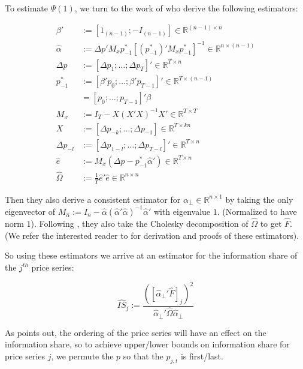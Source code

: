 To estimate $\Psi(1)$, we turn to the work of \cite{KARABIYIK2022} who derive the following estimators:

\begin{align}
\beta' &:= [1_{(n-1)}; -I_{(n-1)}] \in \mathbb{R}^{(n-1) \times n} \\
\hat{\alpha} &:= \Delta p' M_{x} p_{-1}^* [ (p_{-1}^*)' M_{x} p_{-1}^*]^{-1} \in \mathbb{R}^{n \times (n-1)}\\
\Delta p &:= [\Delta p_{1}; \dots ; \Delta p_{T}]' \in \mathbb{R}^{T \times n} \\ 
p_{-1}^* &:= [\beta' p_{0}; \dots ; \beta' p_{T-1}]' \in \mathbb{R}^{T \times (n-1)} \\
&= [p_{0}; \dots ; p_{T-1}]' \beta \\
M_{x} &:= I_{T} - X(X'X)^{-1} X' \in \mathbb{R}^{T \times T} \\
X &:= [\Delta p_{-k}; \dots ; \Delta p_{-1}] \in \mathbb{R}^{T \times kn} \\
\Delta p_{-l} &:= [\Delta p_{1-l}; \dots ; \Delta p_{T-l}]' \in \mathbb{R}^{T \times n} \\
\hat{e} &:= M_{x}(\Delta p - p^{*}_{-1} \hat{\alpha}') \in \mathbb{R}^{T \times n}\\
\hat{\Omega} &:= \frac{1}{T} \hat{e}' \hat{e} \in \mathbb{R}^{n \times n}
\end{align}

Then they also derive a consistent estimator for $\alpha_{\perp} \in \mathbb{R}^{n \times 1}$ by taking the only eigenvector of $M_{\hat{\alpha}} := I_{n} - \hat{\alpha}(\hat{\alpha}' \hat{\alpha})^{-1} \hat{\alpha}'$ with eigenvalue $1$. (Normalized to have norm $1$).
Following \cite{HASBROUCK1995}, they also take the Cholesky decomposition of $\hat{\Omega}$ to get $\hat{F}$.
(We refer the interested reader to \cite{KARABIYIK2022} for derivation and proofs of these estimators).

So using these estimators we arrive at an estimator for the information share of the $j^{th}$ price series:

\begin{equation}
    \hat{IS}_{j} := \frac{([ \hat{\alpha}_{\perp}'\hat{F}]_{j})^2}{\hat{\alpha}_{\perp}' \hat{\Omega} \hat{\alpha}_{\perp}}
\end{equation}

As \cite{HASBROUCK1995} points out, the ordering of the price series will have an effect on the information share, so to achieve upper/lower bounds on information share for price series $j$, we permute the $p$ so that the $p_{j, t}$ is first/last.



